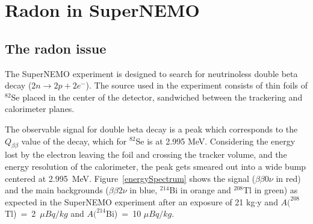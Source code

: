 \documentclass[main.tex]{subfiles}
\begin{document}
\chapter{Radon in SuperNEMO}\label{chap:Radon}





\section{The radon issue}


The SuperNEMO experiment is designed to search for neutrinoless double beta decay ($ 2n \rightarrow 2p + 2e^-$). The source used in the experiment consists of thin foils of $^{82}$Se placed in the center of the detector, sandwiched between the trackering and calorimeter planes. 

\bigskip

\noindent The observable signal for double beta decay is a peak which corresponds to the $Q_{\beta \beta}$ value of the decay, which for $^{82}$Se is at 2.995 MeV. Considering the energy lost by the electron leaving the foil and crossing
the tracker volume, and the energy resolution of the calorimeter, the peak gets smeared out into a wide bump centered at 2.995~MeV. Figure~\ref{energySpectrum} shows the signal ($\beta \beta 0 \nu$ in red) and the main backgrounds ($\beta \beta 2 \nu$ in blue, $^{214}$Bi in orange and $^{208}$Tl in green) as expected in the SuperNEMO experiment after an exposure of 21 kg$\cdot$y and $A(^{208}$Tl)~=~2~$\mu Bq/kg$  and  $A(^{214}$Bi)~=~10 $\mu Bq/kg$.
\end{document}
